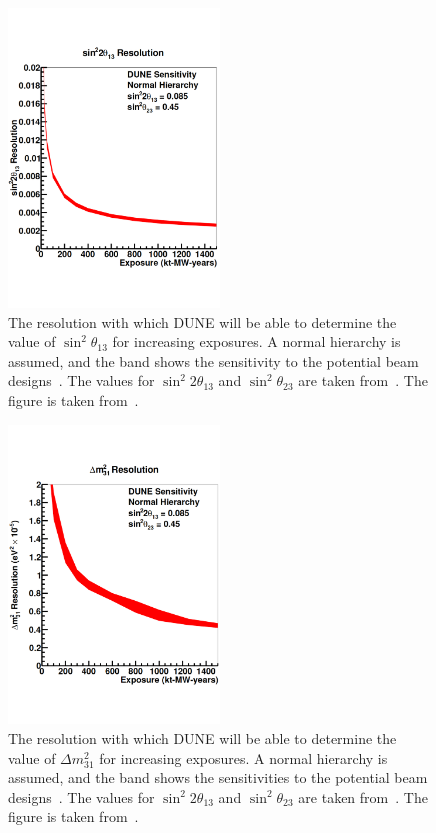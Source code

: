 \begin{figure}
  \centering
  \includegraphics[width=0.5\textwidth]{DUNETheta13Res}
  \caption[The resolution with which DUNE will be able to determine the value of $\sin^{2}\theta_{13}$ for increasing exposures]
          {The resolution with which DUNE will be able to determine the value of $\sin^{2}\theta_{13}$ for increasing exposures. A normal hierarchy is assumed, and the band shows the sensitivity to the potential beam designs~\citep{DUNECDR_V3}. The values for $\sin^{2}2\theta_{13}$ and $\sin^{2}\theta_{23}$ are taken from~\citep{NuFit2014}. The figure is taken from~\citep{DUNECDR_V2}.}
  \label{fig:DUNETheta13Res}
\end{figure}

\begin{figure}
  \centering
  \includegraphics[width=0.5\textwidth]{DUNEDeltaMRes}
  \caption[The resolution with which DUNE will be able to determine the value of $\Delta m^{2}_{31}$ for increasing exposures]
          {The resolution with which DUNE will be able to determine the value of $\Delta m^{2}_{31}$ for increasing exposures. A normal hierarchy is assumed, and the band shows the sensitivities to the potential beam designs~\citep{DUNECDR_V3}. The values for $\sin^{2}2\theta_{13}$ and $\sin^{2}\theta_{23}$ are taken from~\citep{NuFit2014}. The figure is taken from~\citep{DUNECDR_V2}.}
  \label{fig:DUNEDeltaMRes}
\end{figure}

